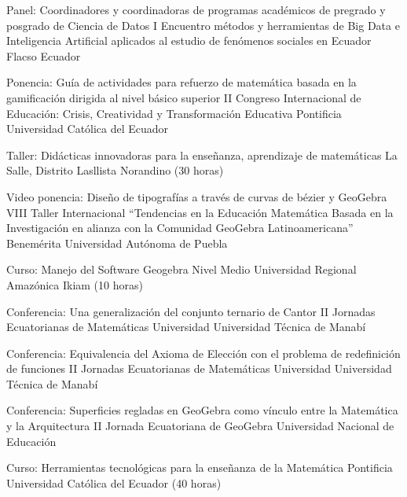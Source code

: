 \documentclass[
	a4paper,
	maincolor=cvblue!70!blue,
	sidecolor=gray!30,
	sectioncolor=cvblue!70!blue,
    sidebarwidth=7.5cm,
	topbottommargin=20pt,
	leftrightmargin=20pt,
]{fortysecondscv}
\begin{document}
    
    {Panel: Coordinadores y coordinadoras de  programas académicos de pregrado y posgrado de Ciencia de Datos}
    {I Encuentro métodos y herramientas de Big Data e Inteligencia Artificial aplicados al estudio de fenómenos sociales en Ecuador}
    {Flacso Ecuador}
    
    {Ponencia: Guía de actividades para refuerzo de matemática basada en la gamificación dirigida al nivel básico superior}
    {II Congreso Internacional de Educación: Crisis, Creatividad y Transformación Educativa}
    {Pontificia Universidad Católica del Ecuador}
    
    {Taller: Didácticas innovadoras para la enseñanza, aprendizaje de matemáticas}
    {}
    {La Salle, Distrito Lasllista Norandino (30 horas)}
    
    {Video ponencia: Diseño de tipografías a través de curvas de bézier y GeoGebra}
    {VIII Taller Internacional “Tendencias en la Educación Matemática Basada en la Investigación en alianza con la Comunidad GeoGebra Latinoamericana”}
    {Benemérita Universidad Autónoma de Puebla}
    

    {Curso: Manejo del Software Geogebra Nivel Medio}
    {}
    {Universidad Regional Amazónica Ikiam (10 horas)}
    
    {Conferencia: Una generalización del conjunto ternario de Cantor}
    {II Jornadas Ecuatorianas de Matemáticas}
    {Universidad Universidad Técnica de Manabí}
    

    {Conferencia: Equivalencia del Axioma de Elección con el problema de redefinición de funciones}
    {II Jornadas Ecuatorianas de Matemáticas}
    {Universidad Universidad Técnica de Manabí}
    
    {Conferencia: Superficies regladas en GeoGebra como vínculo entre la Matemática y la Arquitectura}
    {II Jornada Ecuatoriana de GeoGebra}
    {Universidad Nacional de Educación}
    

    {Curso: Herramientas tecnológicas para la enseñanza de la Matemática}
    {}
    {Pontificia Universidad Católica del Ecuador (40 horas)}
    

    
    
\end{document}
